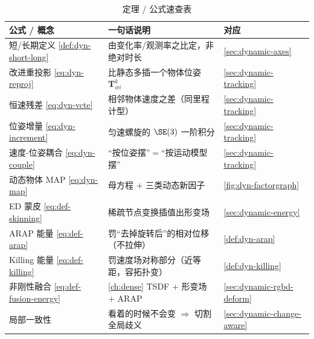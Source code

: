 \begin{table}[H]\centering\small
\caption{定理 / 公式速查表}
\begin{tabular}{lll}
\toprule
公式 / 概念 & 一句话说明 & 对应 \\
\midrule
短/长期定义 \cref{def:dyn-short-long} & 由变化率/观测率之比定，非绝对时长 & \cref{sec:dynamic-axes} \\
改进重投影 \cref{eq:dyn-reproj} & 比静态多插一个物体位姿 $\mathbf{T}_{wi}^{k}$ & \cref{sec:dynamic-tracking} \\
恒速残差 \cref{eq:dyn-vcte} & 相邻物体速度之差（同里程计型）& \cref{sec:dynamic-tracking} \\
位姿增量 \cref{eq:dyn-increment} & 匀速螺旋的 $\SE(3)$ 一阶积分 & \cref{sec:dynamic-tracking} \\
速度-位姿耦合 \cref{eq:dyn-couple} & “按位姿摆”$=$“按运动模型摆” & \cref{sec:dynamic-tracking} \\
动态物体 MAP \cref{eq:dyn-map} & 母方程 $+$ 三类动态新因子 & \cref{fig:dyn-factorgraph} \\
ED 蒙皮 \cref{eq:def-skinning} & 稀疏节点变换插值出形变场 & \cref{sec:dynamic-energy} \\
ARAP 能量 \cref{eq:def-arap} & 罚“去掉旋转后”的相对位移（不拉伸）& \cref{def:dyn-arap} \\
Killing 能量 \cref{eq:def-killing} & 罚速度场对称部分（近等距，容拓扑变）& \cref{def:dyn-killing} \\
非刚性融合 \cref{eq:def-fusion-energy} & \cref{ch:dense} TSDF $+$ 形变场 $+$ ARAP & \cref{sec:dynamic-rgbd-deform} \\
局部一致性 & 看着的时候不会变 $\Rightarrow$ 切割全局歧义 & \cref{sec:dynamic-change-aware} \\
\bottomrule
\end{tabular}
\end{table}

